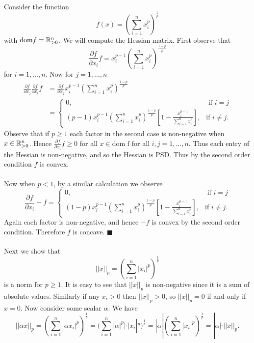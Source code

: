 \documentclass[letterpaper,12pt,oneside,onecolumn]{article}
\begin{document}
\paragraph{}
Consider the function
$$f(x) = (\sum_{i=1}^n x_i^p)^\frac{1}{p}$$
with $\text{dom} f = \mathbb{R}^n_{>0}$. We will compute the Hessian matrix. First observe that
$$\frac{\partial f}{\partial x_i} f = x_i^{p-1}(\sum_{i=1}^n x_i^p)^\frac{1-p}{p}$$
for $i = 1, \dots, n$. Now for $j = 1, \dots, n$
\begin{align*}
\frac{\partial f}{\partial x_j}\frac{\partial f}{\partial x_i} f &= \frac{\partial f}{\partial x_j}   x_i^{p-1}(\sum_{i=1}^n x_i^p)^\frac{1-p}{p} \\
&= \begin{cases}
0, &\text{ if } i=j \\
(p-1)x_i^{p-1}(\sum_{i=1}^n x_i^p)^\frac{1-p}{p}[1- \frac{x_i^{p-1}}{\sum_{i=1}^n x_i^p}], &\text{if } i \neq j.
\end{cases}
\end{align*}
Observe that if $p \geq 1$ each factor in the second case is non-negative when $x \in \mathbb{R}^n_{>0}$. Hence $\frac{\partial f}{\partial x_i} f  \geq 0$ for all $x \in \text{dom f}$ for all $i,j = 1, \dots, n$. Thus each entry of the Hessian is non-negative, and so the Hessian is PSD. Thus by the second order condition $f$ is convex.
\paragraph{}
Now when $p < 1$, by a similar calculation we observe
$$\frac{\partial f}{\partial x_i} -f = \begin{cases}
0, &\text{ if } i=j \\
(1-p)x_i^{p-1}(\sum_{i=1}^n x_i^p)^\frac{1-p}{p}[1- \frac{x_i^{p-1}}{\sum_{i=1}^n x_i^p}], &\text{if } i \neq j.
\end{cases}$$
Again each factor is non-negative, and hence $-f$ is convex by the second order condition. Therefore $f$ is concave. $\blacksquare$
\paragraph{}
Next we show that
$$||x||_p = (\sum_{i=1}^n |x_i|^p)^\frac{1}{p}$$
is a norm for $p\geq 1$. It is easy to see that $||x||_p$ is non-negative since it is a sum of absolute values. Similarly if any $x_i > 0$ then $||x||_p > 0$, so $||x||_p = 0$ if and only if $x = 0$. Now consider some scalar $\alpha$. We have
$$||\alpha x||_p = (\sum_{i=1}^n |\alpha x_i|^p)^\frac{1}{p} = (\sum_{i=1}^n |\alpha|^p|\cdot |x_i|^p)^\frac{1}{p} = |\alpha|(\sum_{i=1}^n |x_i|^p)^\frac{1}{p} = |\alpha|\cdot ||x||_p.$$
\end{document}
